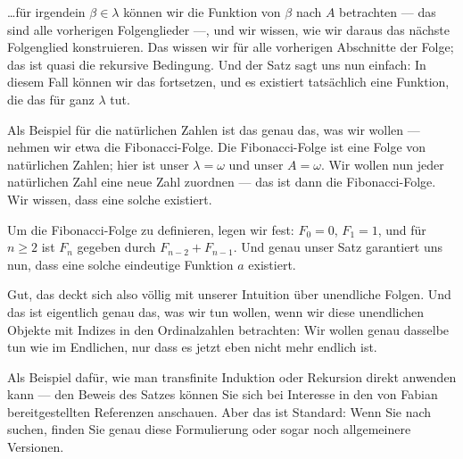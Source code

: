 \begin{spoken-clean}[00:34:20 - 00:36:40]
\dots für irgendein $\beta \in \lambda$ können wir die Funktion von $\beta$ nach $A$ betrachten --- das sind alle vorherigen Folgenglieder ---, und wir wissen, wie wir daraus das nächste Folgenglied konstruieren. Das wissen wir für alle vorherigen Abschnitte der Folge; das ist quasi die rekursive Bedingung. Und der Satz sagt uns nun einfach: In diesem Fall können wir das fortsetzen, und es existiert tatsächlich eine Funktion, die das für ganz $\lambda$ tut.

Als Beispiel für die natürlichen Zahlen ist das genau das, was wir wollen --- nehmen wir etwa die Fibonacci-Folge. Die Fibonacci-Folge ist eine Folge von natürlichen Zahlen; hier ist unser $\lambda = \omega$ und unser $A = \omega$. Wir wollen nun jeder natürlichen Zahl eine neue Zahl zuordnen --- das ist dann die Fibonacci-Folge. Wir wissen, dass eine solche existiert.

Um die Fibonacci-Folge zu definieren, legen wir fest: $F_0 = 0$, $F_1 = 1$, und für $n \ge 2$ ist $F_n$ gegeben durch $F_{n-2} + F_{n-1}$. Und genau unser Satz garantiert uns nun, dass eine solche eindeutige Funktion $a$ existiert.
\end{spoken-clean}

\begin{math-stroke}
\end{math-stroke}

\begin{spoken-clean}[00:36:40 - 00:38:05]
Gut, das deckt sich also völlig mit unserer Intuition über unendliche Folgen. Und das ist eigentlich genau das, was wir tun wollen, wenn wir diese unendlichen Objekte mit Indizes in den Ordinalzahlen betrachten: Wir wollen genau dasselbe tun wie im Endlichen, nur dass es jetzt eben nicht mehr endlich ist.

Als Beispiel dafür, wie man transfinite Induktion oder Rekursion direkt anwenden kann --- den Beweis des Satzes können Sie sich bei Interesse in den von Fabian bereitgestellten Referenzen anschauen. Aber das ist Standard: Wenn Sie nach  suchen, finden Sie genau diese Formulierung oder sogar noch allgemeinere Versionen.
\end{spoken-clean}

